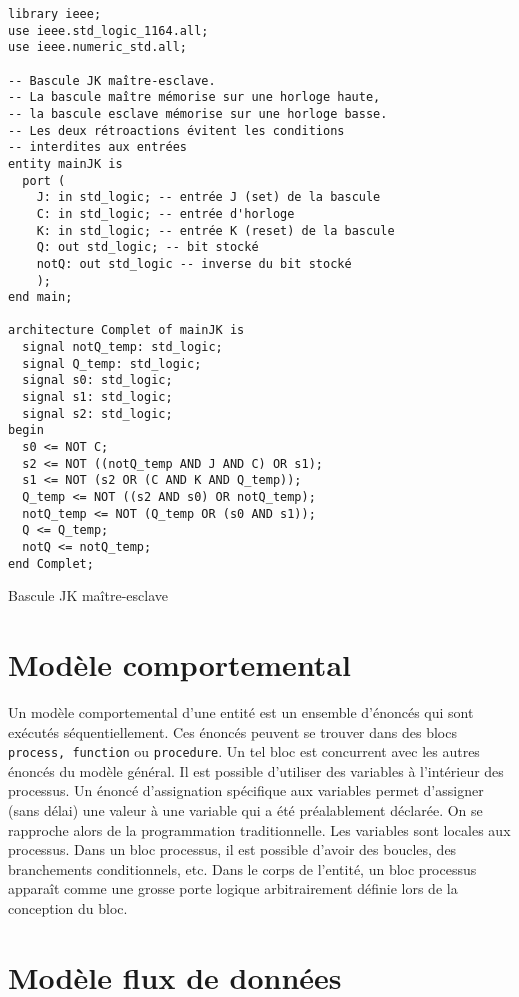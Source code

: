 \documentclass[letter, oneside]{book}
\begin{document}
\begin{listing}[htbp]
\begin{verbatim}
library ieee;
use ieee.std_logic_1164.all;
use ieee.numeric_std.all;

-- Bascule JK maître-esclave.
-- La bascule maître mémorise sur une horloge haute, 
-- la bascule esclave mémorise sur une horloge basse. 
-- Les deux rétroactions évitent les conditions 
-- interdites aux entrées 
entity mainJK is
  port (
    J: in std_logic; -- entrée J (set) de la bascule
    C: in std_logic; -- entrée d'horloge
    K: in std_logic; -- entrée K (reset) de la bascule
    Q: out std_logic; -- bit stocké
    notQ: out std_logic -- inverse du bit stocké
    );
end main;

architecture Complet of mainJK is
  signal notQ_temp: std_logic;
  signal Q_temp: std_logic;
  signal s0: std_logic;
  signal s1: std_logic;
  signal s2: std_logic;
begin
  s0 <= NOT C;
  s2 <= NOT ((notQ_temp AND J AND C) OR s1);
  s1 <= NOT (s2 OR (C AND K AND Q_temp));
  Q_temp <= NOT ((s2 AND s0) OR notQ_temp);
  notQ_temp <= NOT (Q_temp OR (s0 AND s1));
  Q <= Q_temp;
  notQ <= notQ_temp;
end Complet;
\end{verbatim}
\caption{Bascule JK maître-esclave}
\end{listing}

\section{Modèle comportemental}
\label{sec:orgab013d6}

Un modèle comportemental d'une entité est un ensemble d'énoncés qui
sont exécutés séquentiellement. Ces énoncés peuvent se trouver dans
des blocs \texttt{process, function} ou \texttt{procedure}. Un tel bloc est concurrent
avec les autres énoncés du modèle général. Il est possible d'utiliser
des variables à l'intérieur des processus. Un énoncé d'assignation
spécifique aux variables permet d'assigner (sans délai) une valeur à
une variable qui a été préalablement déclarée. On se rapproche alors
de la programmation traditionnelle. Les variables sont locales aux
processus. Dans un bloc processus, il est possible d'avoir des
boucles, des branchements conditionnels, etc. Dans le corps de
l'entité, un bloc processus apparaît comme une grosse porte logique
arbitrairement définie lors de la conception du bloc.

\section{Modèle flux de données}
\label{sec:org675d6be}
\end{document}
